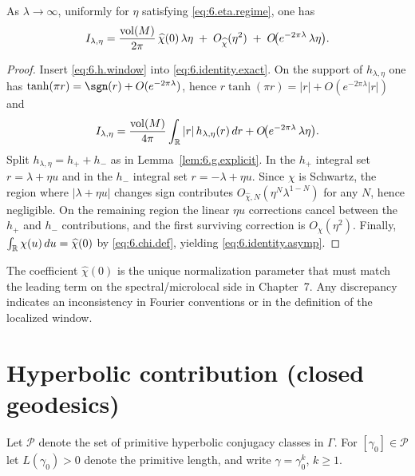 \begin{lemma}\label{lem:6.identity.asymp}
As $\lambda\to\infty$, uniformly for $\eta$ satisfying \eqref{eq:6.eta.regime}, one has
\begin{equation}\label{eq:6.identity.asymp}
I_{\lambda,\eta}
=\frac{\mathop{\mathrm{vol}}\nolimits(M)}{2\pi}\,\widehat\chi(0)\,\lambda\eta
\;+\;O_{\widehat\chi}(\eta^2)
\;+\;O\!\big(e^{-2\pi\lambda}\,\lambda\eta\big).
\end{equation}
\end{lemma}

\begin{proof}
Insert \eqref{eq:6.h.window} into \eqref{eq:6.identity.exact}.
On the support of $h_{\lambda,\eta}$ one has $\tanh(\pi r)=\sgn(r)+O(e^{-2\pi\lambda})$, hence
$r\tanh(\pi r)=|r|+O(e^{-2\pi\lambda}|r|)$ and
\[
I_{\lambda,\eta}
=\frac{\mathop{\mathrm{vol}}\nolimits(M)}{4\pi}\int_{\mathbb{R}} |r|\,h_{\lambda,\eta}(r)\,dr
+O\!\big(e^{-2\pi\lambda}\,\lambda\eta\big).
\]
Split $h_{\lambda,\eta}=h_++h_-$ as in Lemma~\ref{lem:6.g.explicit}.
In the $h_+$ integral set $r=\lambda+\eta u$ and in the $h_-$ integral set $r=-\lambda+\eta u$.
Since $\chi$ is Schwartz, the region where $|\lambda+\eta u|$ changes sign contributes
$O_{\widehat\chi,N}(\eta^N\lambda^{1-N})$ for any $N$, hence negligible.
On the remaining region the linear $\eta u$ corrections cancel between the $h_+$ and $h_-$ contributions,
and the first surviving correction is $O_{\widehat\chi}(\eta^2)$.
Finally, $\int_{\mathbb{R}} \chi(u)\,du=\widehat\chi(0)$ by \eqref{eq:6.chi.def}, yielding \eqref{eq:6.identity.asymp}.
\end{proof}

\begin{remark}\label{rem:6.norm.lock}
The coefficient $\widehat\chi(0)$ is the unique normalization parameter that must match the leading term on the
spectral/microlocal side in Chapter~7. Any discrepancy indicates an inconsistency in Fourier conventions or in the
definition of the localized window.
\end{remark}

\section{Hyperbolic contribution (closed geodesics)}
\label{sec:ch6-hyperbolic}

Let $\mathcal P$ denote the set of primitive hyperbolic conjugacy classes in $\Gamma$.
For $[\gamma_0]\in\mathcal P$ let $L(\gamma_0)>0$ denote the primitive length, and write $\gamma=\gamma_0^k$, $k\ge 1$.

